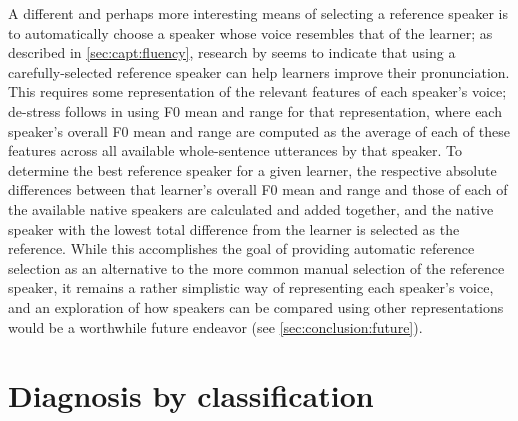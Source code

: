 		A different and perhaps more interesting means of selecting a reference speaker is to automatically choose a speaker whose voice resembles
that of the learner; as described in \cref{sec:capt:fluency}, research by \textcite{Probst2002} seems to indicate that using a carefully-selected reference speaker can help learners improve their pronunciation. 
	This requires some representation of the relevant features of each speaker's voice; de-stress follows \textcite{Probst2002} in using F0 mean and range for that representation, where each speaker's overall F0 mean and range are computed as the average of each of these features across all available whole-sentence utterances by that speaker. To determine the best reference speaker for a given learner, the respective absolute differences between that learner's overall F0 mean and range and those of each of the available native speakers are calculated and added together, and the native speaker with the lowest total difference from the learner is selected as the reference. While this accomplishes the goal of providing automatic reference selection as an alternative to the more common manual selection of the reference speaker, it remains a rather simplistic way of representing each speaker's voice, and an exploration of how speakers can be compared using other representations would be a worthwhile future endeavor (see \cref{sec:conclusion:future}).


	
	

	\section{Diagnosis by classification}
	\label{sec:diag:classification}
	
